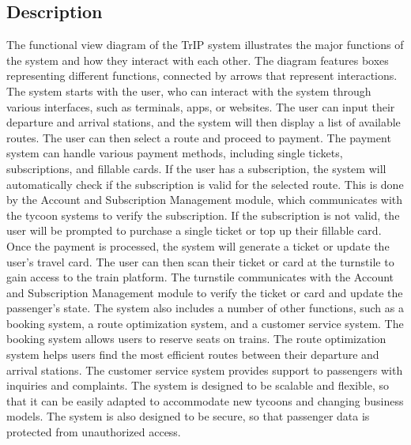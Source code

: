 \subsection*{Description}
The functional view diagram of the TrIP system illustrates the major functions of the system and how they interact with each other. The diagram features boxes representing different functions, connected by arrows that represent interactions.
The system starts with the user, who can interact with the system through various interfaces, such as terminals, apps, or websites. The user can input their departure and arrival stations, and the system will then display a list of available routes. The user can then select a route and proceed to payment.
The payment system can handle various payment methods, including single tickets, subscriptions, and fillable cards. If the user has a subscription, the system will automatically check if the subscription is valid for the selected route. This is done by the Account and Subscription Management module, which communicates with the tycoon systems to verify the subscription. If the subscription is not valid, the user will be prompted to purchase a single ticket or top up their fillable card.
Once the payment is processed, the system will generate a ticket or update the user's travel card. The user can then scan their ticket or card at the turnstile to gain access to the train platform. The turnstile communicates with the Account and Subscription Management module to verify the ticket or card and update the passenger's state.
The system also includes a number of other functions, such as a booking system, a route optimization system, and a customer service system. The booking system allows users to reserve seats on trains. The route optimization system helps users find the most efficient routes between their departure and arrival stations. The customer service system provides support to passengers with inquiries and complaints.
The system is designed to be scalable and flexible, so that it can be easily adapted to accommodate new tycoons and changing business models. The system is also designed to be secure, so that passenger data is protected from unauthorized access.

